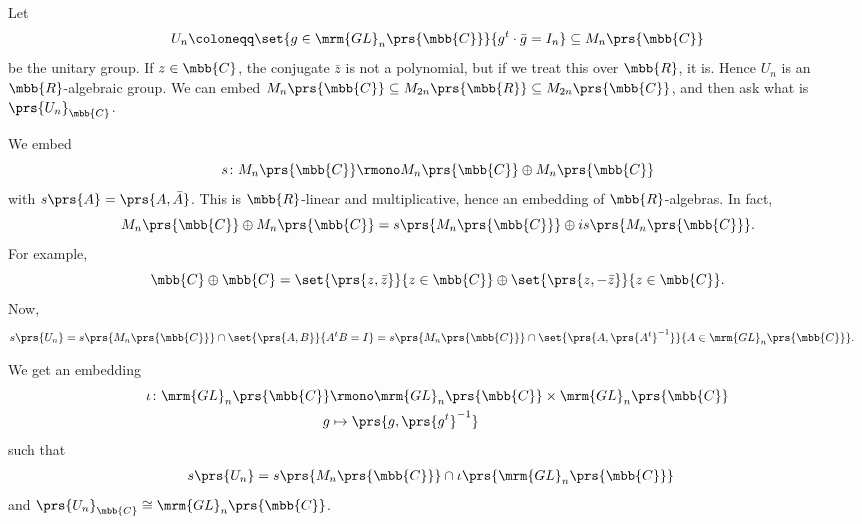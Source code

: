 \documentclass[10pt,a4paper,twoside,openany,hidelinks]{book}
\begin{document}
\begin{example}
Let
\begin{align*}
U_n \coloneqq \set{g \in \mrm{GL}_n\prs{\mbb{C}}}{g^t \cdot \bar{g} = I_n} \subseteq M_n\prs{\mbb{C}}
\end{align*}
be the unitary group.
If $z \in \mbb{C}$, the conjugate $\bar{z}$ is not a polynomial, but if we treat this over $\mbb{R}$, it is. Hence $U_n$ is an $\mbb{R}$-algebraic group. We can embed $M_n\prs{\mbb{C}} \subseteq M_{2n}\prs{\mbb{R}} \subseteq M_{2n}\prs{\mbb{C}}$, and then ask what is $\prs{U_n}_{\mbb{C}}$.

We embed
\[s \colon M_n\prs{\mbb{C}} \rmono M_n\prs{\mbb{C}} \oplus M_n\prs{\mbb{C}}\]
with $s\prs{A} = \prs{A, \bar{A}}$. This is $\mbb{R}$-linear and multiplicative, hence an embedding of $\mbb{R}$-algebras.
In fact,
\[M_n\prs{\mbb{C}} \oplus M_n\prs{\mbb{C}} = s\prs{M_n\prs{\mbb{C}}} \oplus i s\prs{M_n\prs{\mbb{C}}} \text{.}\]
For example, \[\mbb{C} \oplus \mbb{C} = \set{\prs{z,\bar{z}}}{z \in \mbb{C}} \oplus \set{\prs{z, -\bar{z}}}{z \in \mbb{C}} \text{.}\]
Now,
\begin{align*}
s\prs{U_n} &= s\prs{M_n\prs{\mbb{C}}} \cap \set{\prs{A,B}}{A^t B = I} = s\prs{M_n\prs{\mbb{C}}} \cap \set{\prs{A,\prs{A^t}^{-1}}}{A \in \mrm{GL}_n\prs{\mbb{C}}} \text{.}
\end{align*}

We get an embedding
\begin{align*}
\iota \colon \mrm{GL}_n\prs{\mbb{C}} &\rmono \mrm{GL}_n\prs{\mbb{C}} \times \mrm{GL}_n\prs{\mbb{C}} \\
g &\mapsto \prs{g, \prs{g^t}^{-1}}
\end{align*}
such that
\begin{align*}
s\prs{U_n} &= s\prs{M_n\prs{\mbb{C}}} \cap \iota\prs{\mrm{GL}_n\prs{\mbb{C}}}
\end{align*}
and $\prs{U_n}_{\mbb{C}} \cong \mrm{GL}_n\prs{\mbb{C}}$.
\end{example}

\backmatter
\end{document}
